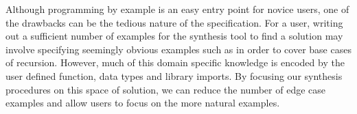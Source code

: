 Although programming by example is an easy entry point for novice
users, one of the drawbacks can be the tedious nature of the
specification.  For a user, writing out a sufficient number of
examples for the synthesis tool to find a solution may involve
specifying seemingly obvious examples such as \codeinline{[]->[]} in
order to cover base cases of recursion.  However, much of this domain
specific knowledge is encoded by the user defined function, data types
and library imports.  By focusing our synthesis procedures on this
space of solution, we can reduce the number of edge case examples and
allow users to focus on the more natural examples.
